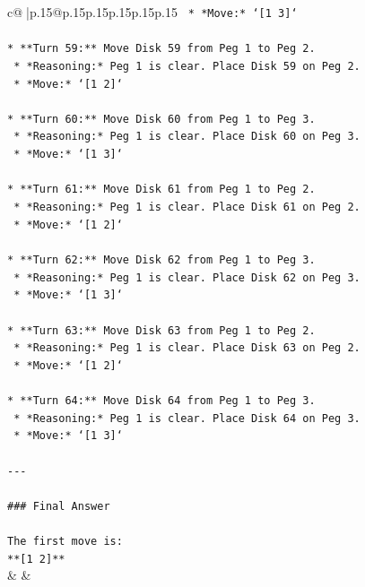 \documentclass{article}
\begin{document}
{\begin{supertabular}{c@{$\;$}|p{.15\linewidth}@{}p{.15\linewidth}p{.15\linewidth}p{.15\linewidth}p{.15\linewidth}p{.15\linewidth}}
{{{\texttt{    *   *Move:* `{[}1 3{]}`} \\
\\ 
\texttt{*   **Turn 59:** Move Disk 59 from Peg 1 to Peg 2.} \\
\texttt{    *   *Reasoning:* Peg 1 is clear. Place Disk 59 on Peg 2.} \\
\texttt{    *   *Move:* `{[}1 2{]}`} \\
\\ 
\texttt{*   **Turn 60:** Move Disk 60 from Peg 1 to Peg 3.} \\
\texttt{    *   *Reasoning:* Peg 1 is clear. Place Disk 60 on Peg 3.} \\
\texttt{    *   *Move:* `{[}1 3{]}`} \\
\\ 
\texttt{*   **Turn 61:** Move Disk 61 from Peg 1 to Peg 2.} \\
\texttt{    *   *Reasoning:* Peg 1 is clear. Place Disk 61 on Peg 2.} \\
\texttt{    *   *Move:* `{[}1 2{]}`} \\
\\ 
\texttt{*   **Turn 62:** Move Disk 62 from Peg 1 to Peg 3.} \\
\texttt{    *   *Reasoning:* Peg 1 is clear. Place Disk 62 on Peg 3.} \\
\texttt{    *   *Move:* `{[}1 3{]}`} \\
\\ 
\texttt{*   **Turn 63:** Move Disk 63 from Peg 1 to Peg 2.} \\
\texttt{    *   *Reasoning:* Peg 1 is clear. Place Disk 63 on Peg 2.} \\
\texttt{    *   *Move:* `{[}1 2{]}`} \\
\\ 
\texttt{*   **Turn 64:** Move Disk 64 from Peg 1 to Peg 3.} \\
\texttt{    *   *Reasoning:* Peg 1 is clear. Place Disk 64 on Peg 3.} \\
\texttt{    *   *Move:* `{[}1 3{]}`} \\
\\ 
\texttt{{-}{-}{-}} \\
\\ 
\texttt{\#\#\# Final Answer} \\
\\ 
\texttt{The first move is:} \\
\texttt{**{[}1 2{]}**} \\
            }
        }
    }
    & & \\ \\


\end{supertabular}}
\end{document}
